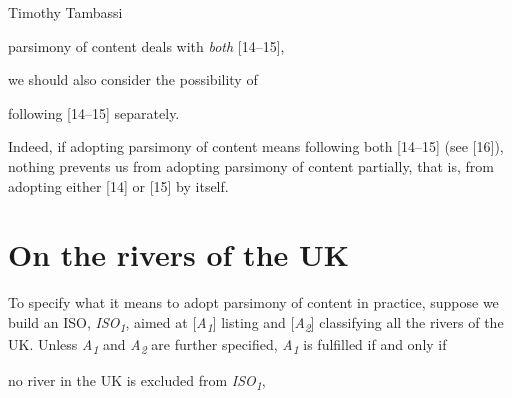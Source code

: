 \begin{artengenv}{Timothy Tambassi}
\setcounter{saveenumtambassi}{\value{enumi}}

\begin{enumerate}[label={[\arabic*]}]

\setcounter{enumi}{\value{saveenumtambassi}}

\item parsimony of content deals with \textit{both} [14–15],

\end{enumerate}

we should also consider the possibility of



\setcounter{saveenumtambassi}{\value{enumi}}

\begin{enumerate}[label={[\arabic*]}]

\setcounter{enumi}{\value{saveenumtambassi}}

\item following [14–15] separately.

\end{enumerate}

Indeed, if adopting parsimony of content means following both [14–15] (see [16]), nothing prevents us from adopting parsimony of content partially, that is, from adopting either [14] or [15] by itself.



\section{On the rivers of the UK}

To specify what it means to adopt parsimony of content in practice, suppose we build an ISO, \textit{ISO}\textit{\textsubscript{1}}, aimed at [\textit{A}\textit{\textsubscript{1}}] listing and [\textit{A}\textit{\textsubscript{2}}] classifying all the rivers of the UK. Unless \textit{A}\textit{\textsubscript{1}} and \textit{A}\textit{\textsubscript{2}} are further specified, \textit{A}\textit{\textsubscript{1}} is fulfilled if and only if



\setcounter{saveenumtambassi}{\value{enumi}}

\begin{enumerate}[label={[\arabic*]}]

\setcounter{enumi}{\value{saveenumtambassi}}

\item no river in the UK is excluded from \textit{ISO}\textit{\textsubscript{1}},


\end{enumerate}
\end{artengenv}
